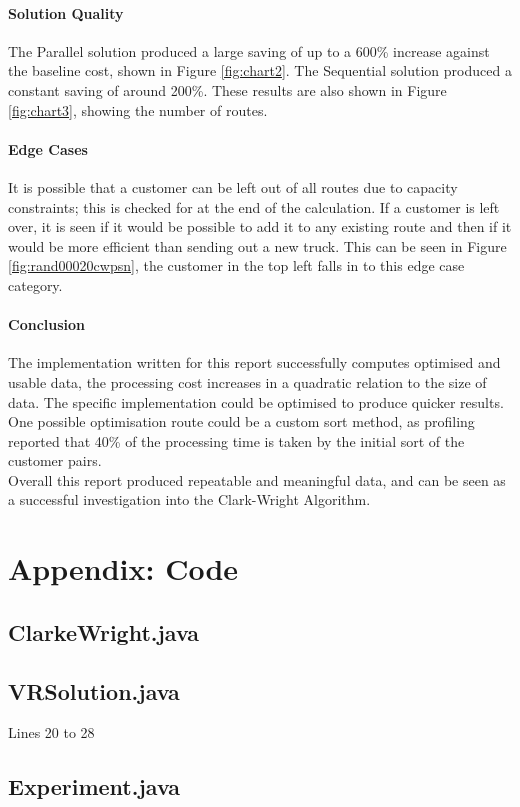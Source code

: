 \documentclass[conference]{acmsiggraph}
\begin{document}
\paragraph{Solution Quality}
The Parallel solution produced a large saving of up to a 600\% increase against the baseline cost, shown in Figure \ref{fig:chart2}. The Sequential solution produced a constant saving of around 200\%. These results are also shown in Figure \ref{fig:chart3}, showing the number of routes.

\paragraph{Edge Cases}
It is possible that a customer can be left out of all routes due to capacity constraints; this is checked for at the end of the calculation. If a customer is left over, it is seen if it would be possible to add it to any existing route and then if it would be more efficient than sending out a new truck. This can be seen in Figure \ref{fig:rand00020cwpsn}, the customer in the top left falls in to this edge case category.

\paragraph{Conclusion}
The implementation written for this report successfully computes optimised and usable data, the processing cost increases in a quadratic relation to the size of data. The specific implementation could be optimised to produce quicker results. One possible optimisation route could be a custom sort method, as profiling reported that 40\% of the processing time is taken by the initial sort of the customer pairs.\\
Overall this report produced repeatable and meaningful data, and can be seen as a successful investigation into the Clark-Wright Algorithm.


\clearpage

\section{Appendix: Code}
\subsection{ClarkeWright.java}


\vfill

\subsection{VRSolution.java}
Lines 20 to 28


\subsection{Experiment.java}

\end{document}
